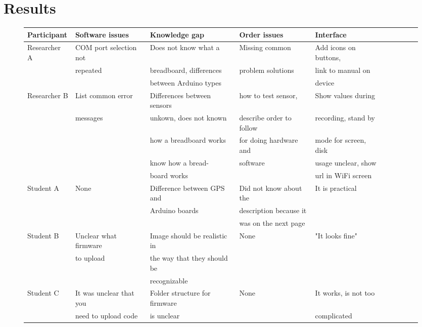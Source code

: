 \documentclass[conference]{IEEEtran}
\begin{document}
\section{Results}
		\begin{figure*}[ht]
			\centering
			\begin{tabular}{ | l | l | l | l | l | l | l | l | l | l | }
				\hline
			Participant		& Software issues			& Knowledge gap					& Order issues				& Interface				\\ \hline \hline
			
			
			Researcher A	& COM port selection not	& Does not know what a			& Missing common			& Add icons on buttons,	\\ 
							& repeated					& breadboard, differences		& problem solutions			& link to manual on		\\ 
							& 							& between Arduino types			& 							& device				\\ \hline
							
			Researcher B	& List common error			& Differences between sensors	& how to test sensor,		& Show values during	\\ 
							& messages 					& unkown, does not known 		& describe order to	follow	& recording, stand by	\\
							& 							& how a breadboard works		& for doing	hardware and	& mode for screen, disk	\\
							& 							& know how a bread-				& software					& usage unclear, show	\\
							& 							& board works					& 							& url in WiFi screen	\\	\hline

			Student A		& None						& Difference between GPS and 	& Did not know about the	& It is practical		\\
							&  							& Arduino boards				& description because it 	& 						\\
							&  							& 								& was on the next page		& 						\\ \hline

			Student B		& Unclear what firmware		& Image	should be realistic in	& None						& "It looks fine"		\\ 
							& to upload					& the way that they should be 	& 							& 						\\ 
							&  							& recognizable					& 							& 						\\ \hline
							

			Student C		& It was unclear that you	& Folder structure for firmware& None						& It works, is not too	\\ 
							& need to upload code		& is unclear					& 							& complicated			\\ \hline


\end{tabular}
\end{figure*}
\end{document}
